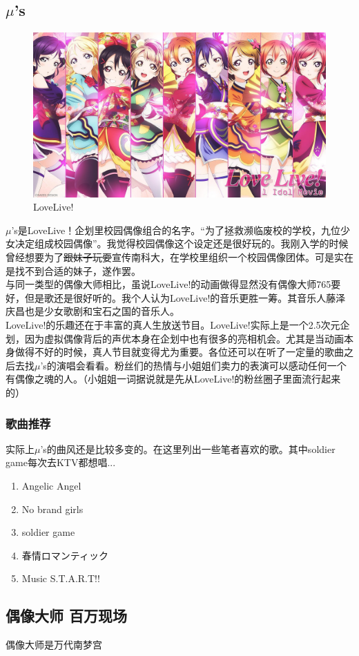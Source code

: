 \documentclass{ctexart}
\begin{document}
\subsection{$\mu$'s}
\begin{figure}[h]
\centering
 \includegraphics[width=1.0\textwidth]{lovelive.jpg}
 \caption{LoveLive!}
\end{figure}
$\mu$'s是LoveLive！企划里校园偶像组合的名字。“为了拯救濒临废校的学校，九位少女决定组成校园偶像”。我觉得校园偶像这个设定还是很好玩的。我刚入学的时候曾经想要为了\sout{跟妹子玩耍}宣传南科大，在学校里组织一个校园偶像团体。可是实在是找不到合适的妹子，遂作罢。\\
与同一类型的偶像大师相比，虽说LoveLive!的动画做得显然没有偶像大师765要好，但是歌还是很好听的。我个人认为LoveLive!的音乐更胜一筹。其音乐人藤泽庆昌也是少女歌剧和宝石之国的音乐人。\\
LoveLive!的乐趣还在于丰富的真人生放送节目。LoveLive!实际上是一个2.5次元企划，因为虚拟偶像背后的声优本身在企划中也有很多的亮相机会。尤其是当动画本身做得不好的时候，真人节目就变得尤为重要。各位还可以在听了一定量的歌曲之后去找$\mu$'s的演唱会看看。粉丝们的热情与小姐姐们卖力的表演可以感动任何一个有偶像之魂的人。（小姐姐一词据说就是先从LoveLive!的粉丝圈子里面流行起来的）
\subsubsection*{歌曲推荐}
实际上$\mu$'s的曲风还是比较多变的。在这里列出一些笔者喜欢的歌。其中soldier game每次去KTV都想唱...
\begin{enumerate}
\item Angelic Angel
\item No brand girls
\item soldier game
\item 春情ロマンティック
\item Music S.T.A.R.T!!
\end{enumerate}

\subsection{偶像大师 百万现场}
偶像大师是万代南梦宫
\end{document}
